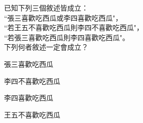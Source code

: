 \ifx\ntpcNinetyThree\undefined[93學年基北區] \fi
已知下列三個敘述皆成立：\\
``張三喜歡吃西瓜或李四喜歡吃西瓜"，\\
``若王五不喜歡吃西瓜則李四不喜歡吃西瓜"，\\
``若張三喜歡吃西瓜則李四喜歡吃西瓜"。\\
下列何者敘述一定會成立？
  \begin{optionlist}
  \item 張三喜歡吃西瓜
  \item 李四不喜歡吃西瓜
  \item 李四喜歡吃西瓜\label{ntpc-93-a21}
  \item 王五不喜歡吃西瓜
  \end{optionlist}